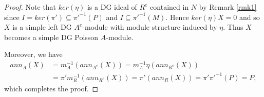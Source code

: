 \documentclass[a4paper,10pt]{amsart}
\theoremstyle{definition}
\theoremstyle{remark}
\numberwithin{equation}{section}
\begin{document}
\begin{proof}
Note that $ker(\eta)$ is a DG ideal of $R^{e}$ contained in $N$ by
Remark \ref{rmk1} since $I=ker(\pi')\subseteq \pi'^{-1}(P)$ and
$I\subseteq \pi'^{-1}(M)$. Hence $ker(\eta)X=0$ and so $X$ is a
simple left DG $A^e$-module with module structure induced by $\eta$.
Thus $X$ becomes a simple DG Poisson $A$-module.

Moreover, we have
\begin{equation}
\begin{split}
ann_A(X)&=m_A^{-1}(ann_{A^e}(X))=m_A^{-1}\eta(ann_{R^e}(X))\\
&=\pi'm_R^{-1}(ann_{R^e}(X))=\pi'(ann_{R}(X))=\pi'\pi'^{-1}(P)=P,
\end{split}\nonumber
\end{equation}
which completes the proof.
\end{proof}
\end{document}
